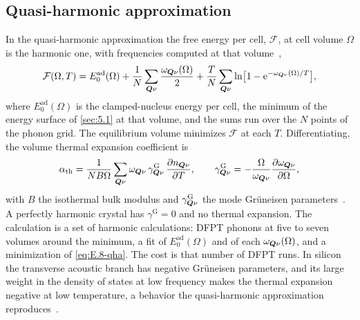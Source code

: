 \subsection{Quasi-harmonic approximation}

In the quasi-harmonic approximation the free energy per cell, $\mathcal{F}$, at cell volume $\Omega$ is the harmonic one, with frequencies computed at that volume~\cite[Eq.~(4)]{baroni2010thermal},
\begin{equation}
  \mathcal{F}(\Omega,T) = E^{\mathrm{ad}}_0(\Omega) + \frac1N\sum_{\bm{Q}\nu}\frac{\omega_{\bm{Q}\nu}(\Omega)}{2} + \frac TN\sum_{\bm{Q}\nu}\ln\bigl[1 - \mathrm{e}^{-\omega_{\bm{Q}\nu}(\Omega)/T}\bigr] ,
  \label{eq:E.8-qha}
\end{equation}
where $E^{\mathrm{ad}}_0(\Omega)$ is the clamped-nucleus energy per cell, the minimum of the energy surface of \cref{sec:5.1} at that volume, and the sums run over the $N$ points of the phonon grid. The equilibrium volume minimizes $\mathcal{F}$ at each $T$. Differentiating, the volume thermal expansion coefficient is
\begin{equation}
  \alpha_{\mathrm{th}} = \frac{1}{N B\Omega}\sum_{\bm{Q}\nu}\omega_{\bm{Q}\nu}\,\gamma^{\mathrm{G}}_{\bm{Q}\nu}\,\frac{\partial n_{\bm{Q}\nu}}{\partial T}, \qquad
  \gamma^{\mathrm{G}}_{\bm{Q}\nu} = -\frac{\Omega}{\omega_{\bm{Q}\nu}}\frac{\partial\omega_{\bm{Q}\nu}}{\partial\Omega} ,
  \label{eq:E.8-beta}
\end{equation}
with $B$ the isothermal bulk modulus and $\gamma^{\mathrm{G}}_{\bm{Q}\nu}$ the mode Grüneisen parameters~\cite[Eqs.~(6) and~(9)]{baroni2010thermal}. A perfectly harmonic crystal has $\gamma^{\mathrm{G}} = 0$ and no thermal expansion. The calculation is a set of harmonic calculations: DFPT phonons at five to seven volumes around the minimum, a fit of $E^{\mathrm{ad}}_0(\Omega)$ and of each $\omega_{\bm{Q}\nu}(\Omega)$, and a minimization of \cref{eq:E.8-qha}. The cost is that number of DFPT runs. In silicon the transverse acoustic branch has negative Grüneisen parameters, and its large weight in the density of states at low frequency makes the thermal expansion negative at low temperature, a behavior the quasi-harmonic approximation reproduces~\cite[Sect.~5.1]{baroni2010thermal}.


